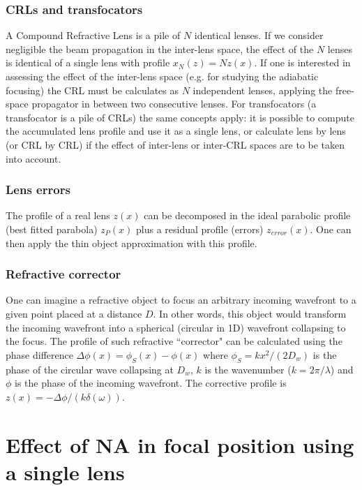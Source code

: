 \documentclass{iucr}              %
\begin{document}
\subsubsection{CRLs and transfocators}
A Compound Refractive Lens is a pile of $N$ identical lenses. If we consider negligible the beam propagation in the inter-lens space, the effect of the $N$ lenses is identical of a single lens with profile $x_N(z)=N z(x)$. If one is interested in assessing the effect of the inter-lens space (e.g. for studying the adiabatic focusing)  the CRL must be calculates as $N$ independent lenses, applying the free-space propagator in between two consecutive lenses. For transfocators (a transfocator is a pile of CRLs) the same concepts apply: it is possible to compute the accumulated lens profile and use it as a single lens, or calculate lens by lens (or CRL by CRL) if the effect of inter-lens or inter-CRL spaces are to be taken into account.

\subsubsection{Lens errors}
The profile of a real lens $z(x)$ can be decomposed in the ideal parabolic profile (best fitted parabola) $z_P(x)$ plus a residual profile (errors) $z_{error}(x)$. One can then apply the thin object approximation with this profile. 

\subsubsection{Refractive corrector}
\label{sec:refractorCorrector}
One can imagine a refractive object to focus an arbitrary incoming wavefront to a given point placed at a distance $D$. In other words, this object would transform the incoming wavefront into a spherical (circular in 1D) wavefront collapsing to the focus. The profile of such refractive ``corrector"  can be calculated using the phase difference $\Delta\phi(x)=\phi_S(x)-\phi(x)$ where $\phi_S=k x^2 / (2 D_w)$ is the phase of the circular wave collapsing at $D_w$, $k$ is the wavenumber ($k=2\pi/\lambda$) and $\phi$ is the phase of the incoming wavefront. The corrective profile is $z(x)=-\Delta\phi/(k \delta(\omega))$.



\section{Effect of NA in focal position using a single lens}
\end{document}
